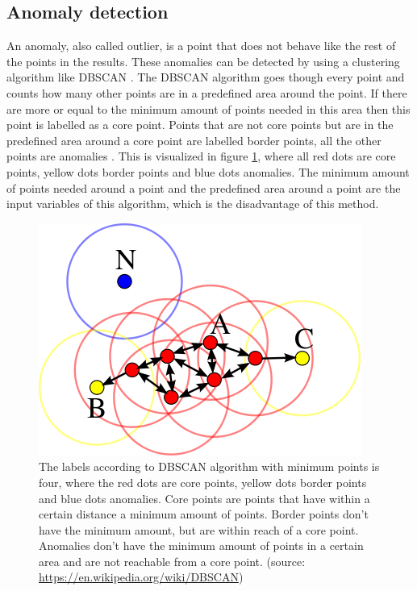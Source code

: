 \subsection{Anomaly detection}
An anomaly, also called outlier, is a point that does not behave like the rest of the points in the results. These anomalies can be detected by using a clustering algorithm like DBSCAN \cite{chandola2009anomaly}. The DBSCAN algorithm goes though every point and counts how many other points are in a predefined area around the point. If there are more or equal to the minimum amount of points needed in this area then this point is labelled as a core point. Points that are not core points but are in the predefined area around a core point are labelled border points, all the other points are anomalies \cite{ester1996density}. This is visualized in figure \ref{fig:dbscan}, where all red dots are core points, yellow dots border points and blue dots anomalies. The minimum amount of points needed around a point and the predefined area around a point are the input variables of this algorithm, which is the disadvantage of this method.

\begin{figure}[h]
    \centering
    \includegraphics[width=.4\textwidth]{graphs/dbscan.png}
    \caption{The labels according to DBSCAN algorithm with minimum points is four, where the red dots are core points, yellow dots border points and blue dots anomalies. Core points are points that have within a certain distance a minimum amount of points. Border points don't have the minimum amount, but are within reach of a core point. Anomalies don't have the minimum amount of points in a certain area and are not reachable from a core point. (source: \url{https://en.wikipedia.org/wiki/DBSCAN})}
    \label{fig:dbscan}
\end{figure}


